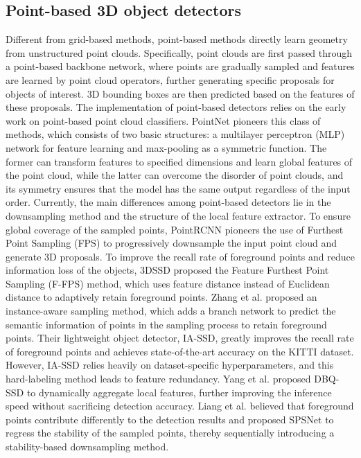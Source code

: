 \subsection{Point-based 3D object detectors}
Different from grid-based methods, point-based methods \cite{qi_deep_2019,shi2019pointrcnn,yang_3dssd_2020} directly learn geometry from unstructured point clouds. Specifically, point clouds are first passed through a point-based backbone network, where points are gradually sampled and features are learned by point cloud operators, further generating specific proposals for objects of interest. 3D bounding boxes are then predicted based on the features of these proposals. The implementation of point-based detectors relies on the early work on point-based point cloud classifiers. PointNet \cite{qi2017pointnet} pioneers this class of methods, which consists of two basic structures: a multilayer perceptron (MLP) network for feature learning and max-pooling as a symmetric function. The former can transform features to specified dimensions and learn global features of the point cloud, while the latter can overcome the disorder of point clouds, and its symmetry ensures that the model has the same output regardless of the input order.
Currently, the main differences among point-based detectors lie in the downsampling method and the structure of the local feature extractor. To ensure global coverage of the sampled points, PointRCNN \cite{shi2019pointrcnn} pioneers the use of Furthest Point Sampling (FPS) to progressively downsample the input point cloud and generate 3D proposals. To improve the recall rate of foreground points and reduce information loss of the objects, 3DSSD \cite{yang_3dssd_2020} proposed the Feature Furthest Point Sampling (F-FPS) method, which uses feature distance instead of Euclidean distance to adaptively retain foreground points. Zhang et al. \cite{zhang2022not} proposed an instance-aware sampling method, which adds a branch network to predict the semantic information of points in the sampling process to retain foreground points. Their lightweight object detector, IA-SSD, greatly improves the recall rate of foreground points and achieves state-of-the-art accuracy on the KITTI dataset. However, IA-SSD relies heavily on dataset-specific hyperparameters, and this hard-labeling method leads to feature redundancy. Yang et al. \cite{yang2022dbq} proposed DBQ-SSD to dynamically aggregate local features, further improving the inference speed without sacrificing detection accuracy. Liang et al. \cite{liang2023spsnet} believed that foreground points contribute differently to the detection results and proposed SPSNet to regress the stability of the sampled points, thereby sequentially introducing a stability-based downsampling method. 
